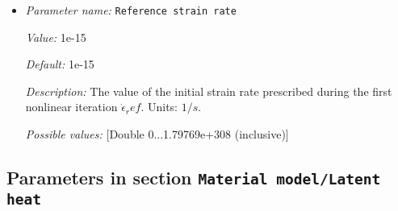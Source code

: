 \begin{itemize}
{\it Possible values:} [Double 0...1.79769e+308 (inclusive)]
\item {\it Parameter name:} {\tt Reference strain rate}
\label{parameters:Material model/Drucker Prager/Viscosity/Reference strain rate}


{\it Value:} 1e-15


{\it Default:} 1e-15


{\it Description:} The value of the initial strain rate prescribed during the first nonlinear iteration $\dot{\epsilon}_ref$. Units: $1/s$.


{\it Possible values:} [Double 0...1.79769e+308 (inclusive)]
\end{itemize}

\subsection{Parameters in section \tt Material model/Latent heat}
\label{parameters:Material_20model/Latent_20heat}

